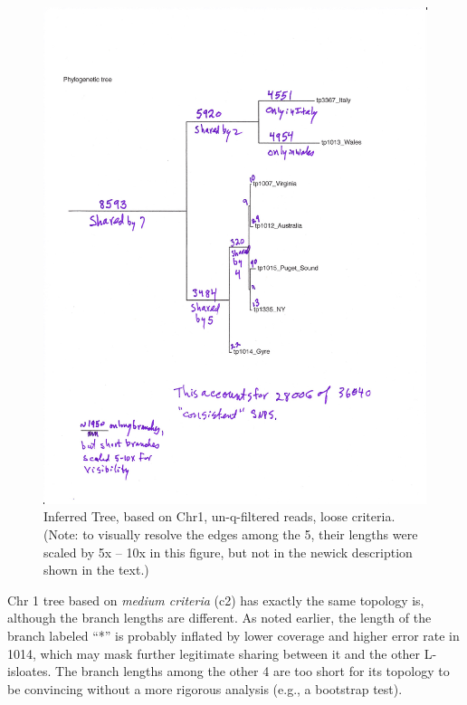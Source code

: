 \documentclass{article}\usepackage[]{graphicx}\usepackage[]{color}
\begin{document}
\begin{figure}
  \begin{center}
    \includegraphics[scale=.5]{00old/shared-snp-tree-annotated-v1.pdf}
    \caption{Inferred Tree, based on Chr1, un-q-filtered reads, loose criteria.  (Note: to visually resolve the edges among the
      5, their lengths were scaled by 5x -- 10x in this figure, but not in the newick description
      shown in the text.)}
    \label{fig:tree-v1}
  \end{center}
\end{figure}

Chr 1 tree based on \emph{medium criteria} (c2) has exactly the same topology is, although the 
branch lengths are different.  As noted earlier, the length of the branch labeled ``*'' is probably
inflated by lower coverage and higher error rate in 1014, which may mask further legitimate sharing 
between it and the other L-isloates.  The branch lengths among the other 4 are too short for its 
topology to be convincing without a more rigorous analysis (e.g., a bootstrap test).
\end{document}
